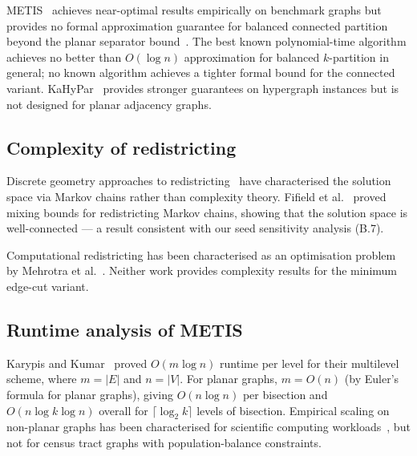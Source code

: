 METIS~\citep{karypis1998} achieves near-optimal results empirically on
benchmark graphs but provides no formal approximation guarantee for
balanced connected partition beyond the planar separator
bound~\citep{lipton1979separator}.
The best known polynomial-time algorithm achieves no better than
$O(\log n)$ approximation for balanced $k$-partition in general; no
known algorithm achieves a tighter formal bound for the connected
variant.
KaHyPar~\citep{kahypar2017} provides stronger guarantees on hypergraph
instances but is not designed for planar adjacency graphs.

\subsection{Complexity of redistricting}

Discrete geometry approaches to redistricting~\citep{duchindist2020}
have characterised the solution space via Markov chains rather than
complexity theory.  Fifield et al.~\citep{fifield2020} proved mixing
bounds for redistricting Markov chains, showing that the solution space
is well-connected --- a result consistent with our seed sensitivity
analysis (B.7).

Computational redistricting has been characterised as an
optimisation problem by Mehrotra et al.~\citep{mehrotra1998optimal}.
Neither work provides complexity results for the minimum edge-cut variant.

\subsection{Runtime analysis of METIS}

Karypis and Kumar~\citep{karypis1998} proved $O(m \log n)$ runtime per
level for their multilevel scheme, where $m = |E|$ and $n = |V|$.
For planar graphs, $m = O(n)$ (by Euler's formula for planar graphs),
giving $O(n \log n)$ per bisection and $O(n \log k \log n)$ overall for
$\lceil \log_2 k \rceil$ levels of bisection.
Empirical scaling on non-planar graphs has been characterised for scientific
computing workloads~\citep{karypis1999multilevel}, but not for census
tract graphs with population-balance constraints.
